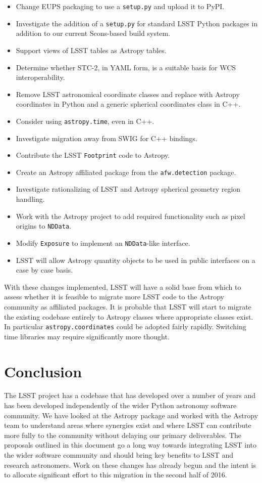 \documentclass[]{spie}  %
\begin{document}
\begin{itemize}
\item Change EUPS packaging to use a \texttt{setup.py} and upload it to PyPI.
\item Investigate the addition of a \texttt{setup.py} for standard LSST Python packages in addition to our current Scons-based build system.
\item Support views of LSST tables as Astropy tables.
\item Determine whether STC-2, in YAML form, is a suitable basis for WCS interoperability.
\item Remove LSST astronomical coordinate classes and replace with Astropy coordinates in Python and a generic spherical coordinates class in C++.
\item Consider using \texttt{astropy.time}, even in C++.
\item Investigate migration away from SWIG for C++ bindings.
\item Contribute the LSST \texttt{Footprint} code to Astropy.
\item Create an Astropy affiliated package from the \texttt{afw.detection} package.
\item Investigate rationalizing of LSST and Astropy spherical geometry region handling.
\item Work with the Astropy project to add required functionality such as pixel origins to \texttt{NDData}.
\item Modify \texttt{Exposure} to implement an \texttt{NDData}-like interface.
\item LSST will allow Astropy quantity objects to be used in public interfaces on a case by case basis.

\end{itemize}

With these changes implemented, LSST will have a solid base from which to assess whether it is feasible to migrate more LSST code to the Astropy community as affiliated packages.
It is probable that LSST will start to migrate the existing codebase entirely to Astropy classes where appropriate classes exist.
In particular \texttt{astropy.coordinates} could be adopted fairly rapidly.
Switching time libraries may require significantly more thought.

\section{Conclusion}

The LSST project has a codebase that has developed over a number of years and has been developed independently of the wider Python astronomy software community.
We have looked at the Astropy package and worked with the Astropy team to understand areas where synergies exist and where LSST can contribute more fully to the community without delaying our primary deliverables.
The proposals outlined in this document go a long way towards integrating LSST into the wider software community and should bring key benefits to LSST and research astronomers.
Work on these changes has already begun and the intent is to allocate significant effort to this migration in the second half of 2016.
\end{document}
